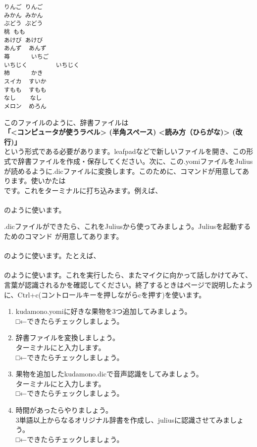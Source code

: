 \begin{lstlisting}[caption=kudamino.yomi,label=kudamino.yomi]
りんご りんご
みかん みかん
ぶどう ぶどう
桃 もも
あけび あけび
あんず  あんず
苺      いちご
いちじく        いちじく
柿      かき
スイカ  すいか
すもも  すもも
なし    なし
メロン  めろん
\end{lstlisting}

このファイルのように、辞書ファイルは\\
\textbf{「<コンピュータが使うラベル> (半角スペース) <読み方（ひらがな)> (改行)」}\\
という形式である必要があります。leafpadなどで新しいファイルを開き、この形式で辞書ファイルを作成・保存してください。次に、この.yomiファイルをJuliusが読めるように.dicファイルに変換します。このために、コマンドが用意してあります。使いかたは\\
です。これをターミナルに打ち込みます。例えば、\\
\\
のように使います。

.dicファイルができたら、これをJuliusから使ってみましょう。Juliusを起動するためのコマンド  が用意してあります。\\
\\
のように使います。たとえば、\\
\\
のように使います。これを実行したら、またマイクに向かって話しかけてみて、言葉が認識されるかを確認してください。終了するときは\pageref{Julius}ページで説明したように、Ctrl+c(コントロールキーを押しながらcを押す)を使います。

\begin{tcolorbox}[title=\useOmetoi]
\begin{enumerate}
\item kudamono.yomiに好きな果物を3つ追加してみましょう。\\□←できたらチェックしましょう。
\item 辞書ファイルを変換しましょう。\\ターミナルにと入力します。\\□←できたらチェックしましょう。
\item 果物を追加したkudamono.dicで音声認識をしてみましょう。\\ターミナルにと入力します。\\□←できたらチェックしましょう。
\item 時間があったらやりましょう。\\3単語以上からなるオリジナル辞書を作成し、juliusに認識させてみましょう。\\□←できたらチェックしましょう。
\end{enumerate}
\end{tcolorbox}